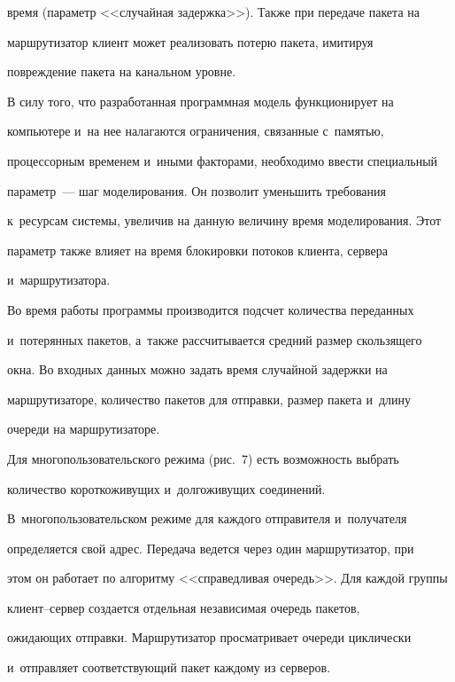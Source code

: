 время (параметр <<случайная задержка>>). Также при передаче пакета на


маршрутизатор клиент может реализовать потерю пакета, имитируя


повреждение пакета на канальном уровне.





  В силу того, что разработанная программная модель функционирует на


компьютере и~на нее налагаются ограничения, связанные с~памятью,


процессорным временем и~иными факторами, необходимо ввести специальный


параметр~--- шаг моделирования. Он позволит уменьшить требования


к~ресурсам системы, увеличив на данную величину время моделирования. Этот


параметр также влияет на время блокировки потоков клиента, сервера


и~маршрутизатора.





  Во время работы программы производится подсчет количества переданных


и~потерянных пакетов, а~также рассчитывается средний размер скользящего


окна. Во входных данных можно задать время случайной задержки на


маршрутизаторе, количество пакетов для отправки, размер пакета и~длину


очереди на маршрутизаторе.





  Для многопользовательского режима (рис.~7) есть возможность выбрать


количество короткоживущих и~долгоживущих соединений.


В~многопользовательском режиме для каждого отправителя и~получателя


определяется свой адрес. Передача ведется через один маршрутизатор, при


этом он работает по алгоритму <<справедливая очередь>>. Для каждой группы


кли\-ент--сер\-вер создается отдельная независимая очередь пакетов,


ожидающих отправки. Маршрутизатор про\-смат\-ри\-ва\-ет очереди циклически


и~отправляет соответствующий пакет каждому из серверов.





